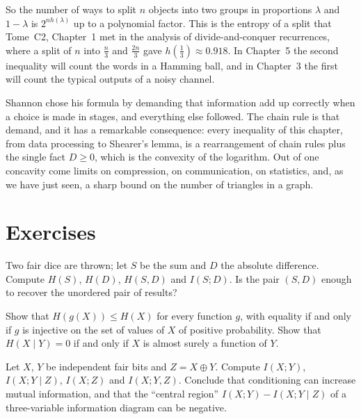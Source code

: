 So the number of ways to split $n$ objects into two groups in proportions $\lambda$ and $1-\lambda$ is $2^{nh(\lambda)}$ up to a polynomial factor. This is the entropy of a split that Tome~C2, Chapter~1 met in the analysis of divide-and-conquer recurrences, where a split of $n$ into $\frac n3$ and $\frac{2n}3$ gave $h(\frac13)\approx0.918$. In Chapter~5 the second inequality will count the words in a Hamming ball, and in Chapter~3 the first will count the typical outputs of a noisy channel.

\begin{beauty}
Shannon chose his formula by demanding that information add up correctly when a choice is made in stages, and everything else followed. The chain rule is that demand, and it has a remarkable consequence: every inequality of this chapter, from data processing to Shearer's lemma, is a rearrangement of chain rules plus the single fact $D\ge0$, which is the convexity of the logarithm. Out of one concavity come limits on compression, on communication, on statistics, and, as we have just seen, a sharp bound on the number of triangles in a graph.
\end{beauty}

\section{Exercises}

\begin{exercise}[$\star$]\label{ex:dice}
Two fair dice are thrown; let $S$ be the sum and $D$ the absolute difference. Compute $H(S)$, $H(D)$, $H(S,D)$ and $I(S;D)$. Is the pair $(S,D)$ enough to recover the unordered pair of results?
\end{exercise}

\begin{exercise}[$\star$]\label{ex:function}
Show that $H(g(X))\le H(X)$ for every function $g$, with equality if and only if $g$ is injective on the set of values of $X$ of positive probability. Show that $H(X\mid Y)=0$ if and only if $X$ is almost surely a function of $Y$.
\end{exercise}

\begin{exercise}[$\star\star$]\label{ex:xor}
Let $X$, $Y$ be independent fair bits and $Z=X\oplus Y$. Compute $I(X;Y)$, $I(X;Y\mid Z)$, $I(X;Z)$ and $I(X;Y,Z)$. Conclude that conditioning can increase mutual information, and that the ``central region'' $I(X;Y)-I(X;Y\mid Z)$ of a three-variable information diagram can be negative.
\end{exercise}

